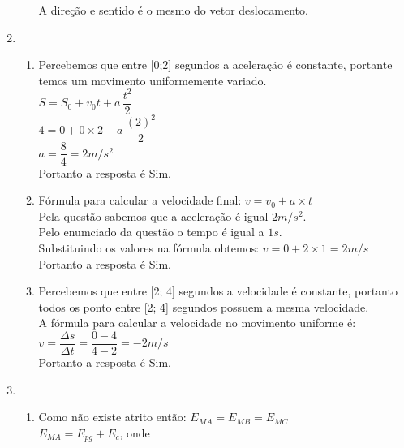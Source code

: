 \documentclass[a4paper, 12pt]{article}
\begin{document}
\begin{enumerate}
\begin{enumerate}
A direção e sentido é o mesmo do vetor deslocamento.

\end{enumerate}

\item \begin{enumerate}
	\item Percebemos que entre [0;2] segundos a aceleração é constante, portante temos um movimento uniformemente variado.\\
	
	$S = S_0 + v_0t + a\,\dfrac{t^2}{2}$\\
	$4 = 0 + 0 \times2 + a\,\dfrac{(2)^2}{2}$\\
	$a = \dfrac{8}{4} =  2 m/s^2$\\
	
	Portanto a resposta é Sim.\\
	
	\item Fórmula para calcular a velocidade final: $v = v_0 + a \times t$ \\
	Pela questão sabemos que a aceleração é igual $2 m/s^2$.\\
	Pelo enumciado da questão o tempo é igual a $1s$.\\
	Substituindo os valores na fórmula obtemos: $v = 0 + 2 \times 1 = 2 m/s$ \\
	
	Portanto a resposta é Sim. \\

	\item Percebemos que entre [2; 4] segundos a velocidade é constante, portanto todos os ponto entre [2; 4] segundos possuem a mesma velocidade.\\
	
	A fórmula para calcular a velocidade no movimento uniforme é:\\ $v = \dfrac{\Delta s}{\Delta t} =  \dfrac{0 - 4}{4 - 2} = -2m/s$ \\ 
	
		Portanto a resposta é Sim. \\
	

\end{enumerate}
\item \begin{enumerate}
	\item  Como não existe atrito então: $E_{MA} = E_{MB} = E_{MC}$ \\

$E_{MA} =  E_{pg} + E_{c}$, onde \\


\end{enumerate}
\end{enumerate}
\end{document}
